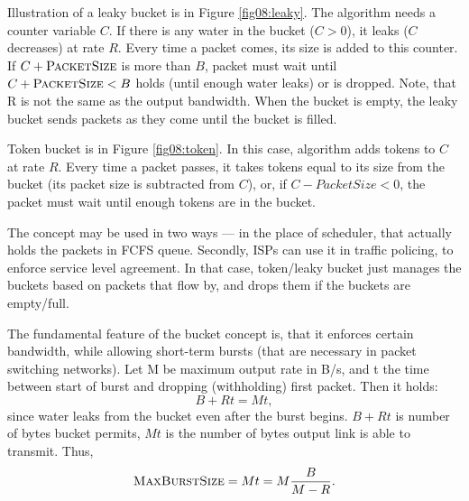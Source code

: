 Illustration of a leaky bucket is in Figure \ref{fig08:leaky}. The algorithm needs a counter variable $C$. If there is any water in the bucket ($C > 0$), it leaks ($C$ decreases) at rate $R$. Every time a packet comes, its size is added to this counter. If $C + \textsc{PacketSize}$ is more than $B$, packet must wait until $C + \textsc{PacketSize} < B$ holds (until enough water leaks) or is dropped. Note, that R is not the same as the output bandwidth. When the bucket is empty, the leaky bucket sends packets as they come until the bucket is filled. 

Token bucket is in Figure \ref{fig08:token}. In this case, algorithm adds tokens to $C$ at rate $R$. Every time a packet passes, it takes tokens equal to its size from the bucket (its packet size is subtracted from $C$), or, if $C - PacketSize < 0$, the packet must wait until enough tokens are in the bucket. 

The concept may be used in two ways --- in the place of scheduler, that actually holds the packets in FCFS queue. Secondly, ISPs can use it in traffic policing, to enforce service level agreement. In that case, token/leaky bucket just manages the buckets based on packets that flow by, and drops them if the buckets are empty/full.

The fundamental feature of the bucket concept is, that it enforces certain bandwidth, while allowing short-term bursts (that are necessary in packet switching networks). Let M be maximum output rate in B/s, and t the time between start of burst and dropping (withholding) first packet. Then it holds:
\[
	B + Rt = Mt,
\]
since water leaks from the bucket even after the burst begins. $B + Rt$ is number of bytes bucket permits, $Mt$ is the number of bytes output link is able to transmit. Thus,
\[
	\textsc{MaxBurstSize} = Mt = M\frac{B}{M - R}.
\]

